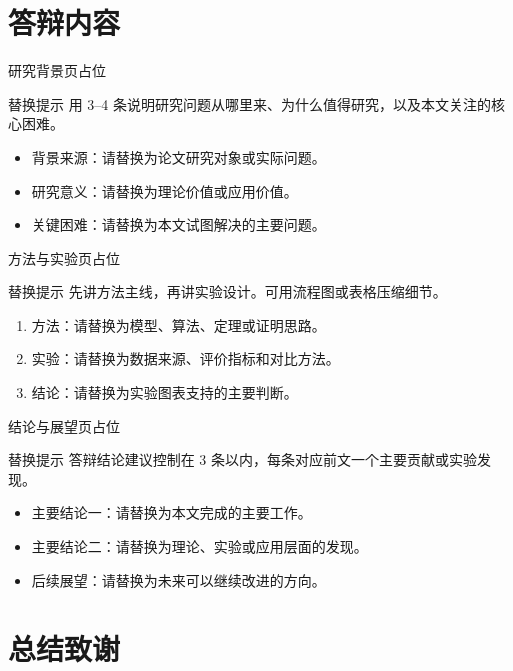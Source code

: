 \documentclass[12pt,aspectratio=43]{beamer}
\newcommand{\JLUSectionTitleFive}{答辩内容}
\newcommand{\JLUSectionTitleSix}{总结致谢}
\begin{document}
\section{\JLUSectionTitleFive}

\begin{frame}{研究背景页占位}
  \begin{block}{替换提示}
    用 3--4 条说明研究问题从哪里来、为什么值得研究，以及本文关注的核心困难。
  \end{block}

  \begin{itemize}
    \item 背景来源：请替换为论文研究对象或实际问题。
    \item 研究意义：请替换为理论价值或应用价值。
    \item 关键困难：请替换为本文试图解决的主要问题。
  \end{itemize}
\end{frame}

\begin{frame}{方法与实验页占位}
  \begin{block}{替换提示}
    先讲方法主线，再讲实验设计。可用流程图或表格压缩细节。
  \end{block}

  \begin{enumerate}
    \item 方法：请替换为模型、算法、定理或证明思路。
    \item 实验：请替换为数据来源、评价指标和对比方法。
    \item 结论：请替换为实验图表支持的主要判断。
  \end{enumerate}
\end{frame}

\begin{frame}{结论与展望页占位}
  \begin{block}{替换提示}
    答辩结论建议控制在 3 条以内，每条对应前文一个主要贡献或实验发现。
  \end{block}

  \begin{itemize}
    \item 主要结论一：请替换为本文完成的主要工作。
    \item 主要结论二：请替换为理论、实验或应用层面的发现。
    \item 后续展望：请替换为未来可以继续改进的方向。
  \end{itemize}
\end{frame}

\section{\JLUSectionTitleSix}
\end{document}
